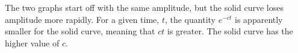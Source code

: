 The two graphs start off with the same amplitude, but the solid curve loses
amplitude more rapidly. For a given time, $t$, the quantity $e^{-ct}$ is apparently
smaller for the solid curve, meaning that $ct$ is greater. The solid curve has
the higher value of $c$.



